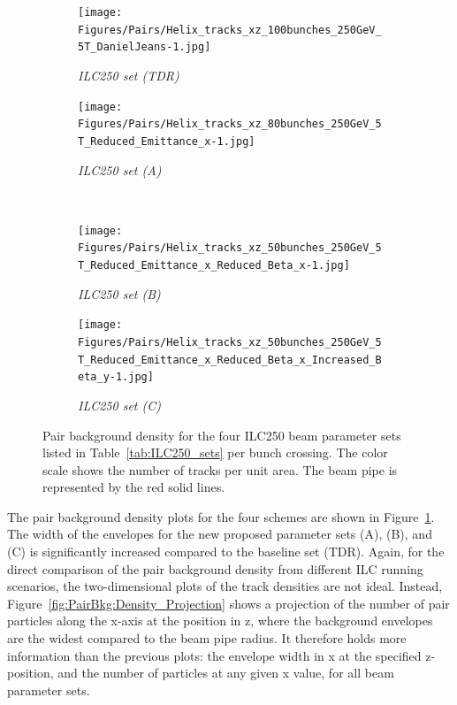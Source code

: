 \begin{figure}
\centering
\begin{subfigure}[t]{0.49\textwidth}
\centering
\texttt{[image: Figures/Pairs/Helix\_tracks\_xz\_100bunches\_250GeV\_5T\_DanielJeans-1.jpg]}
\caption{\textit{ILC250 set (TDR)}}
\end{subfigure}
\hspace*{0.08cm}
\begin{subfigure}[t]{0.49\textwidth}
\centering
\texttt{[image: Figures/Pairs/Helix\_tracks\_xz\_80bunches\_250GeV\_5T\_Reduced\_Emittance\_x-1.jpg]}
\caption{\textit{ILC250 set (A)}}
\end{subfigure}
\\
\begin{subfigure}[t]{0.49\textwidth}
\centering
\texttt{[image: Figures/Pairs/Helix\_tracks\_xz\_50bunches\_250GeV\_5T\_Reduced\_Emittance\_x\_Reduced\_Beta\_x-1.jpg]}
\caption{\textit{ILC250 set (B)}}
\end{subfigure}
\hspace*{0.08cm}
\begin{subfigure}[t]{0.49\textwidth}
\centering
\texttt{[image: Figures/Pairs/Helix\_tracks\_xz\_50bunches\_250GeV\_5T\_Reduced\_Emittance\_x\_Reduced\_Beta\_x\_Increased\_Beta\_y-1.jpg]}
\caption{\textit{ILC250 set (C)}}
\end{subfigure}
\caption[Pair background density for the proposed ILC250 beam parameter sets]{Pair background density for the four ILC250 beam parameter sets listed in Table~\ref{tab:ILC250_sets} per bunch crossing. 
The color scale shows the number of tracks per unit area.
The beam pipe is represented by the red solid lines.}
\label{fig:PairBkg:ILC250_Envelopes}
\end{figure}
The pair background density plots for the four schemes are shown in Figure~\ref{fig:PairBkg:ILC250_Envelopes}.
The width of the envelopes for the new proposed parameter sets (A), (B), and (C) is significantly increased compared to the baseline set (TDR).
Again, for the direct comparison of the pair background density from different ILC running scenarios, the two-dimensional plots of the track densities are not ideal.
Instead, Figure~\ref{fig:PairBkg:Density_Projection} shows a projection of the number of pair particles along the x-axis at the position in z, where the background envelopes are the widest compared to the beam pipe radius.
It therefore holds more information than the previous plots: the envelope width in x at the specified z-position, and the number of particles at any given x value, for all beam parameter sets.
